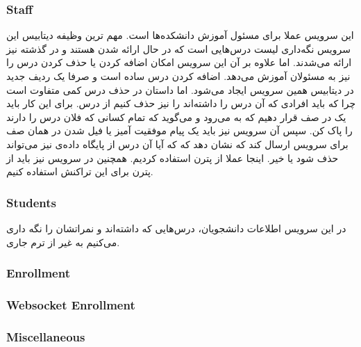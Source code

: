 \subsubsection{Staff}
این سرویس عملا برای مسئول آموزش دانشکده‌ها است. مهم ترین وظیفه دیتابیس این سرویس نگه‌داری
لیست درس‌هایی است که در حال ارائه شدن هستند و در گذشته نیز ارائه می‌شدند. اما علاوه بر آن این سرویس
امکان اضافه کردن یا حذف کردن درس را نیز به مسئولان آموزش می‌دهد. اضافه کردن درس ساده است و
صرفا یک ردیف جدید در دیتابیس همین سرویس ایجاد می‌شود. اما داستان در حذف درس کمی متفاوت است چرا
که باید افرادی که آن درس را داشته‌اند را نیز حذف کنیم از درس. برای این کار باید یک
در صف قرار دهیم که به
می‌رود و می‌گوید که تمام کسانی که فلان درس را دارند را پاک کن. سپس آن سرویس نیز باید یک پیام موفقیت آمیز
یا فیل شدن در همان صف برای سرویس
ارسال کند که نشان دهد که که آیا آن درس از پایگاه داده‌ی
نیز می‌تواند حذف شود یا خیر. اینجا عملا از پترن
استفاده کردیم. همچنین در سرویس
نیز باید از پترن
برای این تراکنش استفاده کنیم.
\subsubsection{Students}
در این سرویس اطلاعات دانشجویان، درس‌هایی که داشته‌اند و نمراتشان را نگه داری می‌کنیم به غیر از ترم جاری.

\subsubsection{Enrollment}
\subsubsection{Websocket Enrollment}
\subsubsection{Miscellaneous}